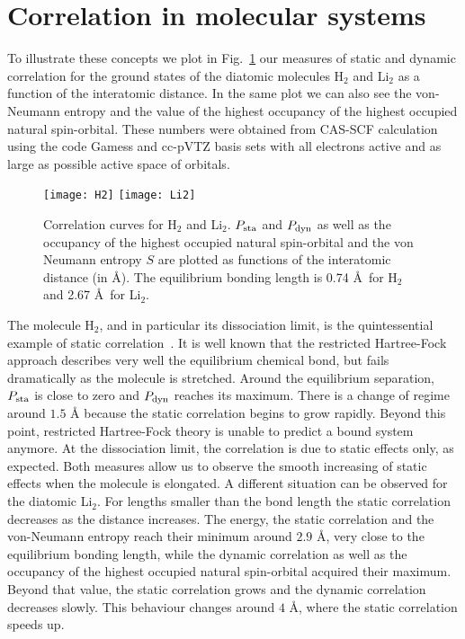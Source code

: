 \documentclass[aps,twocolumn,showpacs,pra,superscriptaddress,floatfix,longbibliography]{revtex4-1}
\newcommand{\7}{\dagger}
\begin{document}
\section{Correlation in molecular systems}
\label{sec:numerics}

To illustrate these concepts we plot in Fig.~\ref{graf:H2}
our measures of static and dynamic correlation for the ground 
states of the diatomic molecules 
H$_2$ and Li$_2$ as a function of the interatomic distance. 
In the same plot we can also see the von-Neumann entropy 
and the value of the highest occupancy of the highest 
occupied natural spin-orbital. These numbers were obtained 
from CAS-SCF calculation using the code Gamess \cite{Gamess} 
and cc-pVTZ basis sets with all electrons active and as large 
as possible active space of orbitals.
 
 \begin{figure}[!t] 
\centering
        {\texttt{[image: H2]}}
        {\texttt{[image: Li2]}}
\caption{Correlation curves for H$_2$ and Li$_2$. 
 $P_{\rm sta}$ and $P_{\rm dyn}$ as
  well as the occupancy of the highest occupied natural 
  spin-orbital and the von Neumann entropy $S$ are 
  plotted as functions of the interatomic distance (in \AA).
  The equilibrium bonding length is 0.74  \AA~for H$_2$ and 2.67 
   \AA~for  Li$_2$.}
 \label{graf:H2}
 \end{figure}

The molecule  H$_2$, and in particular its dissociation limit, is the
 quintessential example of static correlation~\cite{CouFisch}. 
 It is well known that the restricted Hartree-Fock approach 
 describes very well the equilibrium chemical bond, but fails 
 dramatically as the molecule is stretched. Around the equilibrium
 separation, $P_{\rm sta}$ is close to
 zero and $P_{\rm dyn}$ reaches its maximum. There is 
 a change of regime around $1.5$ {\AA} because  the static 
 correlation begins to grow rapidly.
 Beyond this point, restricted Hartree-Fock theory is unable to 
 predict a bound system anymore. At the dissociation 
 limit, the correlation is due to static effects only, as expected. 
 Both measures allow us to observe the smooth increasing 
 of static effects when the 
 molecule is elongated.  A different situation can be observed 
 for the diatomic Li$_2$. For lengths smaller than the bond length
  the static correlation
 decreases as the distance increases.  
 The energy, the static correlation and the von-Neumann
 entropy reach their minimum around $2.9$ \AA, 
 very close to the equilibrium bonding length, while the 
 dynamic correlation as well as the occupancy of the highest 
 occupied natural spin-orbital acquired their maximum. Beyond that 
 value, the static correlation grows and 
 the dynamic correlation decreases slowly. This behaviour
 changes around $4$ \AA, where the static correlation speeds up.
 
\end{document}
